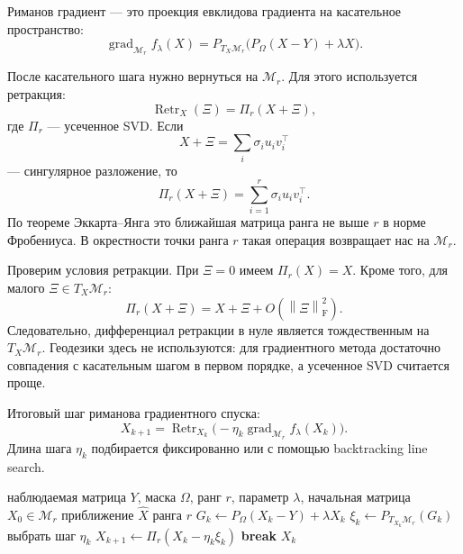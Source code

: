 \documentclass[a4paper,12pt]{article}
\newcommand{\fro}[1]{\left\lVert #1 \right\rVert_{\mathrm F}}
\newcommand{\grad}{\operatorname{grad}}
\renewcommand{\Proj}{P}
\newcommand{\Mcal}{\mathcal{M}}
\newcommand{\Retr}{\operatorname{Retr}}
\begin{document}
Риманов градиент --- это проекция евклидова градиента на касательное пространство:
\begin{equation}
    \label{eq:riemannian-gradient-final}
    \grad_{\Mcal_r} f_\lambda(X)
    =
    \Proj_{T_X\Mcal_r}\bigl(\Proj_\Omega(X-Y)+\lambda X\bigr).
\end{equation}

После касательного шага нужно вернуться на $\Mcal_r$. Для этого используется ретракция:
\begin{equation}
    \label{eq:fixed-rank-retraction-final}
    \Retr_X(\Xi)=\Pi_r(X+\Xi),
\end{equation}
где $\Pi_r$ --- усеченное SVD. Если
\[
    X+\Xi=\sum_i \sigma_i u_i v_i^\top
\]
--- сингулярное разложение, то
\[
    \Pi_r(X+\Xi)=\sum_{i=1}^r \sigma_i u_i v_i^\top.
\]
По теореме Эккарта--Янга это ближайшая матрица ранга не выше $r$ в норме Фробениуса. В окрестности точки ранга $r$ такая операция возвращает нас на $\Mcal_r$.

Проверим условия ретракции. При $\Xi=0$ имеем $\Pi_r(X)=X$. Кроме того, для малого $\Xi\in T_X\Mcal_r$:
\[
    \Pi_r(X+\Xi)=X+\Xi+O(\fro{\Xi}^2).
\]
Следовательно, дифференциал ретракции в нуле является тождественным на $T_X\Mcal_r$. Геодезики здесь не используются: для градиентного метода достаточно совпадения с касательным шагом в первом порядке, а усеченное SVD считается проще.

Итоговый шаг риманова градиентного спуска:
\begin{equation}
    \label{eq:rgd-final}
    X_{k+1}
    =
    \Retr_{X_k}\bigl(-\eta_k\grad_{\Mcal_r} f_\lambda(X_k)\bigr).
\end{equation}
Длина шага $\eta_k$ подбирается фиксированно или с помощью backtracking line search.

\begin{algorithm}[H]
    \caption{Риманов градиентный спуск на $\Mcal_r$}
    \label{alg:rgd-final}
    \begin{algorithmic}[1]
        \Require наблюдаемая матрица $Y$, маска $\Omega$, ранг $r$, параметр $\lambda$, начальная матрица $X_0\in\Mcal_r$
        \Ensure приближение $\widehat X$ ранга $r$
        \State $G_k \gets \Proj_\Omega(X_k-Y)+\lambda X_k$
        \State $\xi_k \gets \Proj_{T_{X_k}\Mcal_r}(G_k)$
        \State выбрать шаг $\eta_k$
        \State $X_{k+1}\gets \Pi_r(X_k-\eta_k\xi_k)$
        \State \textbf{break}
        \EndIf
        \EndFor
        \State \Return $X_k$
    \end{algorithmic}
\end{algorithm}
\end{document}
